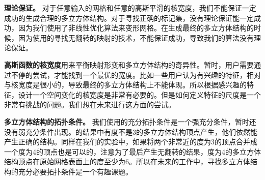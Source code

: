 \textbf{理论保证。} 对于任意输入的网格和任意的高斯平滑的核宽度，我们不能保证一定成功的生成合理的多立方体结构。对于寻找正确的标记集，没有理论保证能一定成功，因为我们使用了非线性优化算法来变形网格。在生成最终的多立方体结构的时候，因为使用的寻找无翻转的映射的技术，不能保证成功，导致我们的算法没有理论保证。

\textbf{高斯函数的核宽度}用来平衡映射形变和多立方体结构的奇异性。暂时，用户需要通过不停的尝试，才能找到一个最优的宽度。比如一些用户认为有兴趣的特征，相对与核宽度是很小的，导致最终的多立方体结构上不能体现。所以根据感兴趣的特征，设计一个空间变化的核宽度是非常有必要的。但是如何定义特征的尺度是一个非常有挑战的问题。我们想在未来进行这方面的尝试。

\textbf{多立方体结构的拓扑条件。} 我们使用的充分拓扑条件是一个强充分条件，暂时还没有弱充分条件出现。\cite{Huang2014}的结果中有度不是3的多立方体结构顶点产生，他们依然能产生正确的结构。同样在我们的实验中，如果将两个非常近的度为3的顶点合并成一个度为4的顶点也是可以的，注意为了最后产生无翻转的结果，度为4的多立方体结构顶点在原始网格表面上的度至少为6。所以在未来的工作中，寻找多立方体结构的充分必要拓扑条件是一个有趣课题。
